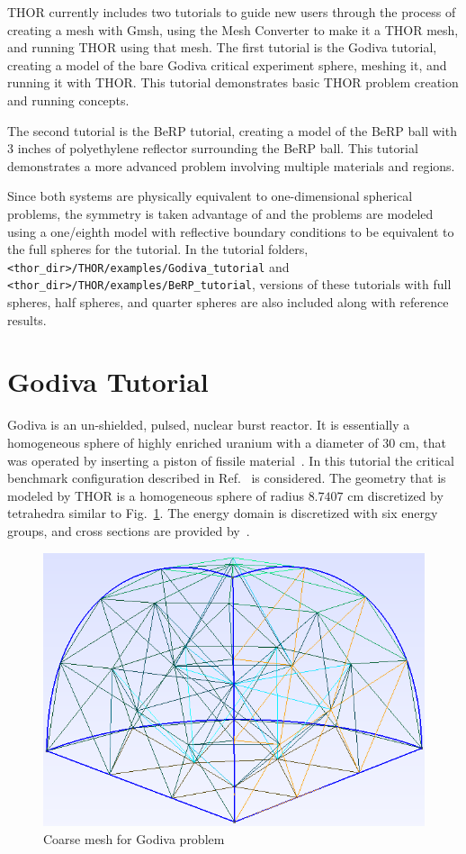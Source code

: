 THOR currently includes two tutorials to guide new users through the process of creating a mesh with Gmsh, using the Mesh Converter to make it a THOR mesh, and running THOR using that mesh.
The first tutorial is the Godiva tutorial, creating a model of the bare Godiva critical experiment sphere, meshing it, and running it with THOR.
This tutorial demonstrates basic THOR problem creation and running concepts.

The second tutorial is the BeRP tutorial, creating a model of the BeRP ball with 3 inches of polyethylene reflector surrounding the BeRP ball.
This tutorial demonstrates a more advanced problem involving multiple materials and regions.

Since both systems are physically equivalent to one-dimensional spherical problems, the symmetry is taken advantage of and the problems are modeled using a one/eighth model with reflective boundary conditions to be equivalent to the full spheres for the tutorial.
In the tutorial folders, \verb"<thor_dir>/THOR/examples/Godiva_tutorial" and \verb"<thor_dir>/THOR/examples/BeRP_tutorial", versions of these tutorials with full spheres, half spheres, and quarter spheres are also included along with reference results.

\section{Godiva Tutorial}

Godiva is an un-shielded, pulsed, nuclear burst reactor. It is essentially a homogeneous sphere of highly enriched uranium with a diameter of $30$ cm, that was operated by inserting a piston of fissile material~\cite{Godiva1961}.
In this tutorial the critical benchmark configuration described in Ref.~\cite{GodivaBenchmark} is considered. The geometry that is modeled by THOR is a homogeneous sphere of radius $8.7407$ cm discretized by tetrahedra similar to Fig.~\ref{fig:godiva_coarse}.
The energy domain is discretized with six energy groups, and cross sections are provided by~\cite{GodivaBenchmark}.

\begin{figure}[th]
  \includegraphics[width=1.0\textwidth]{chapters/tutorials/figures/godiva_coarse.png}
  \caption{Coarse mesh for Godiva problem}
  \label{fig:godiva_coarse}
\end{figure}

